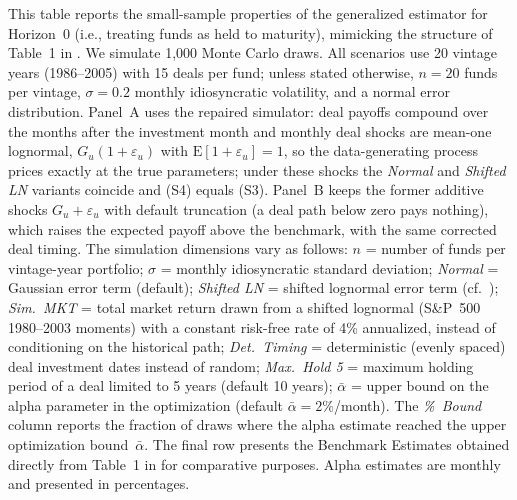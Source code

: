 \begin{table}[htbp]
\begin{minipage}{\linewidth}
This table reports the small-sample properties of the generalized estimator for Horizon~0 (i.e., treating funds as held to maturity), mimicking the structure of Table~1 in \cite{DLP12}. We simulate 1,000 Monte Carlo draws. All scenarios use 20 vintage years (1986--2005) with 15 deals per fund; unless stated otherwise, $n=20$ funds per vintage, $\sigma=0.2$ monthly idiosyncratic volatility, and a normal error distribution. Panel~A uses the repaired simulator: deal payoffs compound over the months after the investment month and monthly deal shocks are mean-one lognormal, $G_u(1+\varepsilon_u)$ with $\mathrm{E}[1+\varepsilon_u]=1$, so the data-generating process prices exactly at the true parameters; under these shocks the \textit{Normal} and \textit{Shifted LN} variants coincide and (S4) equals (S3). Panel~B keeps the former additive shocks $G_u+\varepsilon_u$ with default truncation (a deal path below zero pays nothing), which raises the expected payoff above the benchmark, with the same corrected deal timing. The simulation dimensions vary as follows: $n$ = number of funds per vintage-year portfolio; $\sigma$ = monthly idiosyncratic standard deviation; \textit{Normal} = Gaussian error term (default); \textit{Shifted LN} = shifted lognormal error term (cf.\ \cite{DLP12}); \textit{Sim.~MKT} = total market return drawn from a shifted lognormal (S\&P~500 1980--2003 moments) with a constant risk-free rate of 4\% annualized, instead of conditioning on the historical path; \textit{Det.~Timing} = deterministic (evenly spaced) deal investment dates instead of random; \textit{Max.~Hold 5} = maximum holding period of a deal limited to 5 years (default 10 years); $\bar{\alpha}$ = upper bound on the alpha parameter in the optimization (default $\bar{\alpha} = 2\%$/month). The \textit{\%~Bound} column reports the fraction of draws where the alpha estimate reached the upper optimization bound~$\bar{\alpha}$. The final row presents the Benchmark Estimates obtained directly from Table~1 in \cite{DLP12} for comparative purposes. Alpha estimates are monthly and presented in percentages.
\end{minipage}
\end{table}
